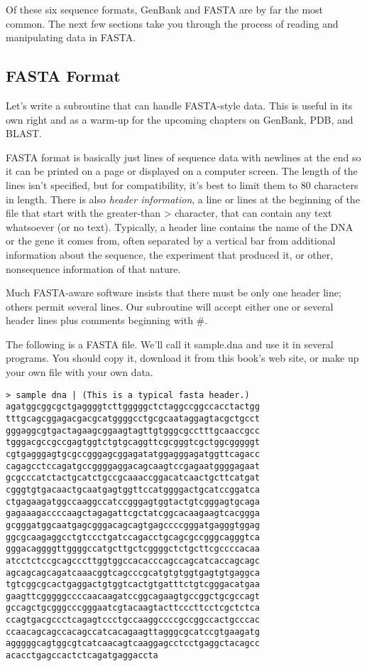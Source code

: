 Of these six sequence formats, GenBank and FASTA are by far the most common. The next few sections take you through the process of reading and manipulating data in FASTA. 

\subsection{FASTA Format}
Let's write a subroutine that can handle FASTA-style data. This is useful in its own right and as a warm-up for the upcoming chapters on GenBank, PDB, and BLAST.

FASTA format is basically just lines of sequence data with newlines at the end so it can be printed on a page or displayed on a computer screen. The length of the lines isn't specified, but for compatibility, it's best to limit them to 80 characters in length. There is also \textit{header information}, a line or lines at the beginning of the file that start with the greater-than > character, that can contain any text whatsoever (or no text). Typically, a header line contains the name of the DNA or the gene it comes from, often separated by a vertical bar from additional information about the sequence, the experiment that produced it, or other, nonsequence information of that nature.

Much FASTA-aware software insists that there must be only one header line; others permit several lines. Our subroutine will accept either one or several header lines plus comments beginning with \#.

The following is a FASTA file. We'll call it sample.dna and use it in several programs. You should copy it, download it from this book's web site, or make up your own file with your own data. 

\begin{lstlisting}
> sample dna | (This is a typical fasta header.)
agatggcggcgctgaggggtcttgggggctctaggccggccacctactgg
tttgcagcggagacgacgcatggggcctgcgcaataggagtacgctgcct
gggaggcgtgactagaagcggaagtagttgtgggcgcctttgcaaccgcc
tgggacgccgccgagtggtctgtgcaggttcgcgggtcgctggcgggggt
cgtgagggagtgcgccgggagcggagatatggagggagatggttcagacc
cagagcctccagatgccggggaggacagcaagtccgagaatggggagaat
gcgcccatctactgcatctgccgcaaaccggacatcaactgcttcatgat
cgggtgtgacaactgcaatgagtggttccatggggactgcatccggatca
ctgagaagatggccaaggccatccgggagtggtactgtcgggagtgcaga
gagaaagaccccaagctagagattcgctatcggcacaagaagtcacggga
gcgggatggcaatgagcgggacagcagtgagccccgggatgagggtggag
ggcgcaagaggcctgtccctgatccagacctgcagcgccgggcagggtca
gggacaggggttggggccatgcttgctcggggctctgcttcgccccacaa
atcctctccgcagcccttggtggccacacccagccagcatcaccagcagc
agcagcagcagatcaaacggtcagcccgcatgtgtggtgagtgtgaggca
tgtcggcgcactgaggactgtggtcactgtgatttctgtcgggacatgaa
gaagttcgggggccccaacaagatccggcagaagtgccggctgcgccagt
gccagctgcgggcccgggaatcgtacaagtacttcccttcctcgctctca
ccagtgacgccctcagagtccctgccaaggccccgccggccactgcccac
ccaacagcagccacagccatcacagaagttagggcgcatccgtgaagatg
agggggcagtggcgtcatcaacagtcaaggagcctcctgaggctacagcc
acacctgagccactctcagatgaggaccta
\end{lstlisting}

